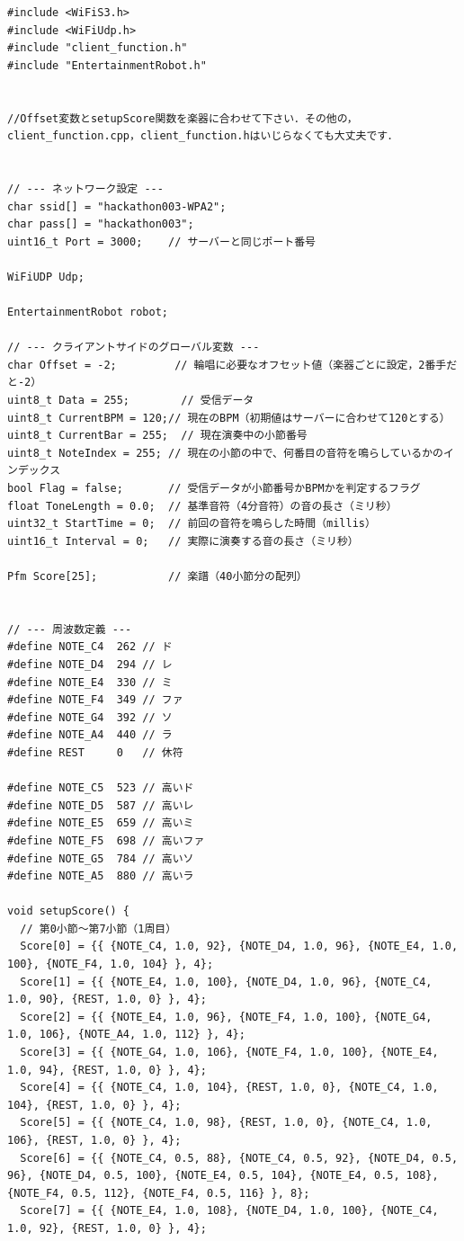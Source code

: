\begin{lstlisting}
#include <WiFiS3.h>
#include <WiFiUdp.h>
#include "client_function.h"
#include "EntertainmentRobot.h"


//Offset変数とsetupScore関数を楽器に合わせて下さい．その他の，client_function.cpp，client_function.hはいじらなくても大丈夫です．


// --- ネットワーク設定 ---
char ssid[] = "hackathon003-WPA2";     
char pass[] = "hackathon003"; 
uint16_t Port = 3000;    // サーバーと同じポート番号

WiFiUDP Udp;

EntertainmentRobot robot;

// --- クライアントサイドのグローバル変数 ---
char Offset = -2;         // 輪唱に必要なオフセット値（楽器ごとに設定，2番手だと-2）
uint8_t Data = 255;        // 受信データ
uint8_t CurrentBPM = 120;// 現在のBPM（初期値はサーバーに合わせて120とする）
uint8_t CurrentBar = 255;  // 現在演奏中の小節番号
uint8_t NoteIndex = 255; // 現在の小節の中で、何番目の音符を鳴らしているかのインデックス
bool Flag = false;       // 受信データが小節番号かBPMかを判定するフラグ
float ToneLength = 0.0;  // 基準音符（4分音符）の音の長さ（ミリ秒）
uint32_t StartTime = 0;  // 前回の音符を鳴らした時間（millis）
uint16_t Interval = 0;   // 実際に演奏する音の長さ（ミリ秒）

Pfm Score[25];           // 楽譜（40小節分の配列）


// --- 周波数定義 ---
#define NOTE_C4  262 // ド
#define NOTE_D4  294 // レ
#define NOTE_E4  330 // ミ
#define NOTE_F4  349 // ファ
#define NOTE_G4  392 // ソ
#define NOTE_A4  440 // ラ
#define REST     0   // 休符

#define NOTE_C5  523 // 高いド
#define NOTE_D5  587 // 高いレ
#define NOTE_E5  659 // 高いミ
#define NOTE_F5  698 // 高いファ
#define NOTE_G5  784 // 高いソ
#define NOTE_A5  880 // 高いラ

void setupScore() {
  // 第0小節〜第7小節（1周目）
  Score[0] = {{ {NOTE_C4, 1.0, 92}, {NOTE_D4, 1.0, 96}, {NOTE_E4, 1.0, 100}, {NOTE_F4, 1.0, 104} }, 4};
  Score[1] = {{ {NOTE_E4, 1.0, 100}, {NOTE_D4, 1.0, 96}, {NOTE_C4, 1.0, 90}, {REST, 1.0, 0} }, 4};
  Score[2] = {{ {NOTE_E4, 1.0, 96}, {NOTE_F4, 1.0, 100}, {NOTE_G4, 1.0, 106}, {NOTE_A4, 1.0, 112} }, 4};
  Score[3] = {{ {NOTE_G4, 1.0, 106}, {NOTE_F4, 1.0, 100}, {NOTE_E4, 1.0, 94}, {REST, 1.0, 0} }, 4};
  Score[4] = {{ {NOTE_C4, 1.0, 104}, {REST, 1.0, 0}, {NOTE_C4, 1.0, 104}, {REST, 1.0, 0} }, 4};
  Score[5] = {{ {NOTE_C4, 1.0, 98}, {REST, 1.0, 0}, {NOTE_C4, 1.0, 106}, {REST, 1.0, 0} }, 4};
  Score[6] = {{ {NOTE_C4, 0.5, 88}, {NOTE_C4, 0.5, 92}, {NOTE_D4, 0.5, 96}, {NOTE_D4, 0.5, 100}, {NOTE_E4, 0.5, 104}, {NOTE_E4, 0.5, 108}, {NOTE_F4, 0.5, 112}, {NOTE_F4, 0.5, 116} }, 8};
  Score[7] = {{ {NOTE_E4, 1.0, 108}, {NOTE_D4, 1.0, 100}, {NOTE_C4, 1.0, 92}, {REST, 1.0, 0} }, 4};


\end{lstlisting}
